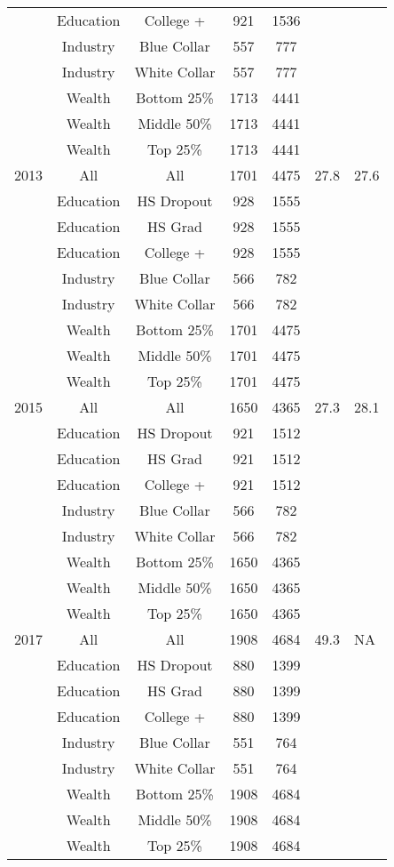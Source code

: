 \begin{tabular}{||l|c|c|c|c|c||}
    & Education & College + & 921 & 1536 & & \\
    & Industry & Blue Collar & 557 & 777 & & \\
    & Industry & White Collar & 557 & 777 & & \\
    & Wealth & Bottom 25\% & 1713 & 4441 & & \\
    & Wealth & Middle 50\% & 1713 & 4441 & & \\
    & Wealth & Top 25\% & 1713 & 4441 & & \\
    2013 & All & All & 1701 & 4475 & 27.8 & 27.6 \\
    & Education & HS Dropout & 928 & 1555 & & \\
    & Education & HS Grad & 928 & 1555 & & \\
    & Education & College + & 928 & 1555 & & \\
    & Industry & Blue Collar & 566 & 782 & & \\
    & Industry & White Collar & 566 & 782 & & \\
    & Wealth & Bottom 25\% & 1701 & 4475 & & \\
    & Wealth & Middle 50\% & 1701 & 4475 & & \\
    & Wealth & Top 25\% & 1701 & 4475 & & \\
    2015 & All & All & 1650 & 4365 & 27.3 & 28.1 \\
    & Education & HS Dropout & 921 & 1512 & & \\
    & Education & HS Grad & 921 & 1512 & & \\
    & Education & College + & 921 & 1512 & & \\
    & Industry & Blue Collar & 566 & 782 & & \\
    & Industry & White Collar & 566 & 782 & & \\
    & Wealth & Bottom 25\% & 1650 & 4365 & & \\
    & Wealth & Middle 50\% & 1650 & 4365 & & \\
    & Wealth & Top 25\% & 1650 & 4365 & & \\
    2017 & All & All & 1908 & 4684 & 49.3 & NA \\
    & Education & HS Dropout & 880 & 1399 & & \\
    & Education & HS Grad & 880 & 1399 & & \\
    & Education & College + & 880 & 1399 & & \\
    & Industry & Blue Collar & 551 & 764 & & \\
    & Industry & White Collar & 551 & 764 & & \\
    & Wealth & Bottom 25\% & 1908 & 4684 & & \\
    & Wealth & Middle 50\% & 1908 & 4684 & & \\
    & Wealth & Top 25\% & 1908 & 4684 & & \\
  \end{tabular}
